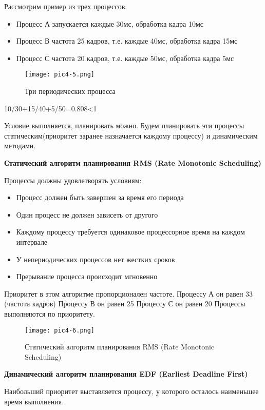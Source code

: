 Рассмотрим пример из трех процессов.
\begin{itemize}
   \item Процесс А запускается каждые 30мс, обработка кадра 10мс
   \item Процесс В частота 25 кадров, т.е. каждые 40мс, обработка кадра 15мс
   \item Процесс С частота 20 кадров, т.е. каждые 50мс, обработка кадра 5мс
\end{itemize}

\begin{figure}[!h]\center
   \texttt{[image: pic4-5.png]}
   \caption{Три периодических процесса}
\end{figure}

10/30+15/40+5/50=0.808<1

Условие выполняется, планировать можно.
Будем планировать эти процессы статическим(приоритет заранее назначается каждому процессу) и динамическим методами.

\textbf{Статический алгоритм планирования RMS (Rate Monotonic Scheduling)}

Процессы должны удовлетворять условиям:

\begin{itemize}
   \item  Процесс должен быть завершен за время его периода
   \item  Один процесс не должен зависеть от другого
   \item  Каждому процессу требуется одинаковое процессорное время на каждом интервале
   \item  У непериодических процессов нет жестких сроков
   \item  Прерывание процесса происходит мгновенно
\end{itemize}

Приоритет в этом алгоритме пропорционален частоте.
Процессу А он равен 33 (частота кадров)
Процессу В он равен 25
Процессу С он равен 20
Процессы выполняются по приоритету.

\begin{figure}[!h]\center
   \texttt{[image: pic4-6.png]}
   \caption{Статический алгоритм планирования RMS (Rate Monotonic Scheduling)}
\end{figure}
\newpage

\textbf{Динамический алгоритм планирования EDF (Earliest Deadline First)}

Наибольший приоритет выставляется процессу, у которого осталось наименьшее время выполнения.

